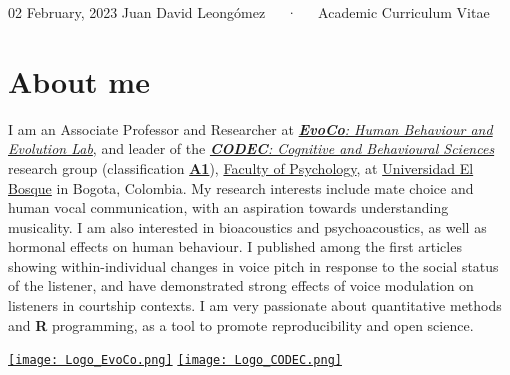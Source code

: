 \documentclass[11pt,a4paper,]{awesome-cv}
\begin{document}
\makecvheader

\makecvfooter
  {02 February, 2023}
    {Juan David Leongómez~~~·~~~Academic Curriculum Vitae}
  {\thepage}





\hypertarget{about-me}{%
\section{About me}\label{about-me}}

\begin{minipage}[c]{0.85\linewidth}
I am an Associate Professor and Researcher at \href{https://jdleongomez.info/en/team/}{\textit{\textbf{EvoCo}: Human Behaviour and Evolution Lab}}, and leader of the \href{https://investigaciones.unbosque.edu.co/codec}{\textit{\textbf{CODEC}: Cognitive and Behavioural Sciences}} research group (classification \href{https://scienti.minciencias.gov.co/gruplac/jsp/visualiza/visualizagr.jsp?nro=00000000001446}{\textbf{A1}}), \href{https://www.uelbosque.edu.co/psicologia}{Faculty of Psychology}, at \href{https://www.uelbosque.edu.co/}{Universidad El Bosque} in Bogota, Colombia. My research interests include mate choice and human vocal communication, with an aspiration towards understanding musicality. I am also interested in bioacoustics and psychoacoustics, as well as hormonal effects on human behaviour. I published among the first articles showing within-individual changes in voice pitch in response to the social status of the listener, and have demonstrated strong effects of voice modulation on listeners in courtship contexts. I am very passionate about quantitative methods and \textbf{R} programming, as a tool to promote reproducibility and open science.
\end{minipage} \begin{minipage}[c]{0.15\linewidth}
\begin{flushright} 
\hfill \href{https://jdleongomez.info/en/team/}{\texttt{[image: Logo\_EvoCo.png]}} \newline \href{https://investigaciones.unbosque.edu.co/codec}{\texttt{[image: Logo\_CODEC.png]}}
\end{flushright}
\end{minipage}
\end{document}
